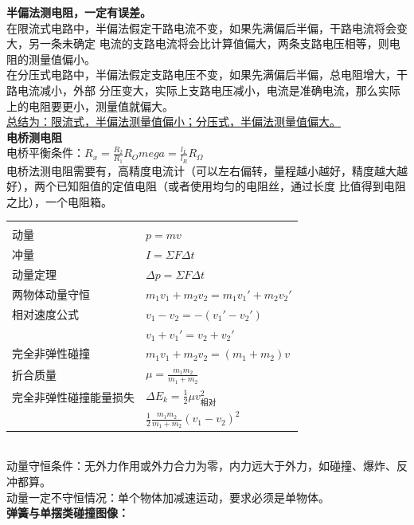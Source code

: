 \documentclass[a4paper, landscape, 10pt, twocolumn]{article}
\begin{document}
\noindent \textbf{半偏法测电阻，一定有误差。}\\
在限流式电路中，半偏法假定干路电流不变，如果先满偏后半偏，干路电流将会变大，另一条未确定
电流的支路电流将会比计算值偏大，两条支路电压相等，则电阻的测量值偏小。\\
在分压式电路中，半偏法假定支路电压不变，如果先满偏后半偏，总电阻增大，干路电流减小，外部
分压变大，实际上支路电压减小，电流是准确电流，那么实际上的电阻要更小，测量值就偏大。\\
\uline{总结为：限流式，半偏法测量值偏小；分压式，半偏法测量值偏大。}\\
\noindent\textbf{电桥测电阻}\\
电桥平衡条件：$R_x=\frac{R_2}{R_1}R_Omega=\frac{l_L}{l_R}R_\Omega$\\
电桥法测电阻需要有，高精度电流计（可以左右偏转，量程越小越好，精度越大越好），两个已知阻值的定值电阻（或者使用均匀的电阻丝，通过长度
比值得到电阻之比），一个电阻箱。\\
\begin{tabularx}{\columnwidth}{XX}
  \rowcolor{blue!30}
  \multicolumn{2}{l}{\parbox[c][2.5\ht\strutbox][c]{0.9\columnwidth}{\Large 动量}} \\
  动量&$p=mv$\\
  冲量&$I=\varSigma F\Delta t$\\
  动量定理&$\Delta p=\varSigma F\Delta t$\\
  两物体动量守恒&$m_1v_1+m_2v_2=m_1v_1'+m_2v_2'$\\
  相对速度公式&$v_1-v_2=-(v_1'-v_2')$\\
  &$v_1+v_1'=v_2+v_2'$\\
  完全非弹性碰撞&$m_1v_1+m_2v_2=(m_1+m_2)v$\\
  折合质量&$\mu=\frac{m_1m_2}{m_1+m_2}$\\
  完全非弹性碰撞能量损失&$\Delta E_k=\frac12\mu v_{\text{相对}}^2$\\
  &$\frac12\frac{m_1m_2}{m_1+m_2}(v_1-v_2)^2$\\
\end{tabularx}
\\
动量守恒条件：无外力作用或外力合力为零，内力远大于外力，如碰撞、爆炸、反冲都算。\\
动量一定不守恒情况：单个物体加减速运动，要求必须是单物体。\\
\noindent \textbf{弹簧与单摆类碰撞图像：}\\
\begin{center}
  \\
\end{center}
\end{document}
